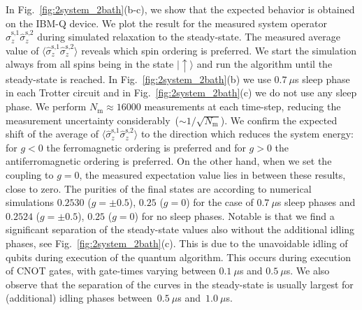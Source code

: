 \documentclass[twocolumn,amsmath,amssymb,pra]{revtex4-2}
\begin{document}
In Fig.~\ref{fig:2system_2bath}(b-c), we show that the expected behavior is obtained on the IBM-Q device.
We plot the result for the measured system operator $\hat\sigma^\textrm{s,1}_z\hat\sigma^\textrm{s,2}_z$
during simulated relaxation to the steady-state.
The measured average value of $\langle\hat\sigma^\textrm{s,1}_z\hat\sigma^\textrm{s,2}_z\rangle$ reveals which spin ordering is preferred.
We start the simulation always from 
all spins being in the state $\lvert \uparrow \rangle$ and run the algorithm
until the steady-state is reached.
In Fig.~\ref{fig:2system_2bath}(b) we use $0.7~\mu$s sleep phase in each Trotter circuit
and in Fig.~\ref{fig:2system_2bath}(c) we do not use any sleep phase.
We perform $N_\textrm{m}\approx 16000$ measurements at each time-step, reducing the measurement uncertainty considerably~($\sim 1/\sqrt{N_\textrm{m}}$).
We confirm the expected shift of the average of $\langle\hat\sigma^\textrm{s,1}_z\hat\sigma^\textrm{s,2}_z\rangle$
to the direction which reduces the system energy:
for $g<0$ the ferromagnetic ordering is preferred and for $g>0$ the antiferromagnetic ordering is preferred.
On the other hand, when we set the coupling to $g=0$, the measured expectation value lies in between these results, close to zero.
The purities of the final states are according to numerical simulations $0.2530$ ($g=\pm 0.5$), $0.25$ ($g=0$) for the case of $0.7~\mu$s sleep phases
and $0.2524$ ($g=\pm 0.5$), $0.25$ ($g=0$) for no sleep phases.
Notable is that
we find a significant separation of the steady-state values also without the additional idling phases, see Fig.~\ref{fig:2system_2bath}(c).
This is due to the unavoidable idling of qubits during execution of the quantum algorithm.
This occurs during execution of CNOT gates, with gate-times varying between $0.1~\mu$s and $0.5~\mu$s.
We also observe that the separation of the curves in the steady-state is usually largest for (additional) idling phases between~$0.5~\mu$s and~$1.0~\mu$s.
\end{document}
